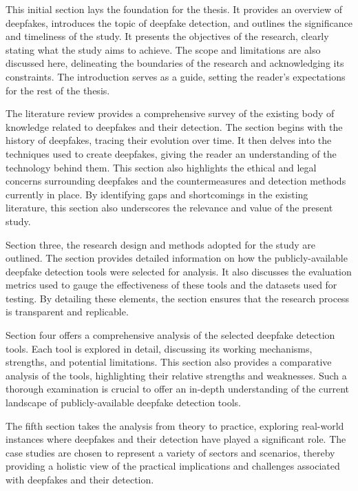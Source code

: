 This initial section lays the foundation for the thesis. It provides an overview of deepfakes, 
introduces the topic of deepfake detection, and outlines the significance and timeliness 
of the study. It presents the objectives of the research, clearly stating what the study 
aims to achieve. The scope and limitations are also discussed here, delineating the 
boundaries of the research and acknowledging its constraints. The introduction serves 
as a guide, setting the reader's expectations for the rest of the thesis.

The literature review provides a comprehensive survey of the existing body of knowledge 
related to deepfakes and their detection. The section begins with the history of 
deepfakes, tracing their evolution over time. It then delves into the techniques used 
to create deepfakes, giving the reader an understanding of the technology behind them. 
This section also highlights the ethical and legal concerns surrounding deepfakes and 
the countermeasures and detection methods currently in place. By identifying gaps and 
shortcomings in the existing literature, this section also underscores the relevance 
and value of the present study.

Section three, the research design and methods adopted for the study are outlined. 
The section provides detailed information on how the publicly-available deepfake 
detection tools were selected for analysis. It also discusses the evaluation metrics 
used to gauge the effectiveness of these tools and the datasets used for testing. 
By detailing these elements, the section ensures that the research process is 
transparent and replicable.

Section four offers a comprehensive analysis of the selected deepfake detection tools. 
Each tool is explored in detail, discussing its working mechanisms, strengths, and 
potential limitations. This section also provides a comparative analysis of the tools, 
highlighting their relative strengths and weaknesses. Such a thorough examination is 
crucial to offer an in-depth understanding of the current landscape of publicly-available 
deepfake detection tools.

The fifth section takes the analysis from theory to practice, exploring real-world instances 
where deepfakes and their detection have played a significant role. The case studies 
are chosen to represent a variety of sectors and scenarios, thereby providing a holistic 
view of the practical implications and challenges associated with deepfakes and their 
detection.

